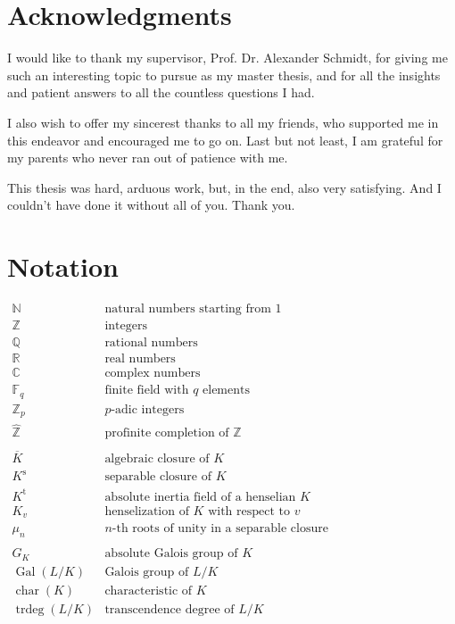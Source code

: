 \section{Acknowledgments}

I would like to thank my supervisor, Prof. Dr. Alexander Schmidt, for giving me such an interesting topic to pursue as my master thesis, and for all the insights and patient answers to all the countless questions I had. 

I also wish to offer my sincerest thanks to all my friends, who supported me in this endeavor and encouraged me to go on. Last but not least, I am grateful for my parents who never ran out of patience with me. 

This thesis was hard, arduous work, but, in the end, also very satisfying. And I couldn't have done it without all of you. Thank you.

\clearpage

\section{Notation}

$\begin{array}{ll}
\mathbb{N} & \text{natural numbers starting from $1$} \\
\mathbb{Z} & \text{integers}\\
\mathbb{Q} & \text{rational numbers}\\
\mathbb{R} & \text{real numbers}\\
\mathbb{C} & \text{complex numbers}\\
\mathbb{F}_q & \text{finite field with $q$ elements}\\
\mathbb{Z}_p & \text{$p$-adic integers}\\
\widehat{\mathbb{Z}} & \text{profinite completion of $\mathbb{Z}$}\\
\\
\overline{K} & \text{algebraic closure of $K$}\\
K^\text{s} & \text{separable closure of $K$}\\
K^\text{t} & \text{absolute inertia field of a henselian $K$}\\
K_v & \text{henselization of $K$ with respect to $v$}\\
\mu_n & \text{$n$-th roots of unity in a separable closure}\\
\\
G_K & \text{absolute Galois group of $K$}\\
\operatorname{Gal}(L/K) & \text{Galois group of $L/K$}\\
\operatorname{char}(K) & \text{characteristic of $K$}\\
\operatorname{trdeg}(L/K) & \text{transcendence degree of $L/K$}\\
\end{array}$
